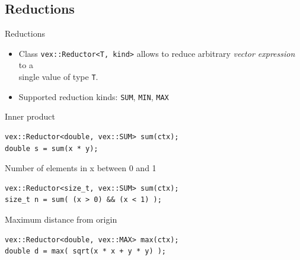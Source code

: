 \documentclass[@BEAMER_OPTIONS@]{beamer}
\newcommand{\code}[1]{\lstinline|#1|}
\begin{document}

\subsection{Reductions}

\begin{frame}[fragile]{Reductions}
    \begin{itemize}
        \item Class \code{vex::Reductor<T, kind>} allows to reduce arbitrary
            \emph{vector expression} to a\\ single value of type \code{T}.
        \item Supported reduction kinds: \code{SUM}, \code{MIN}, \code{MAX}
    \end{itemize}
    \begin{exampleblock}{Inner product}
        \begin{lstlisting}
vex::Reductor<double, vex::SUM> sum(ctx);
double s = sum(x * y);
        \end{lstlisting}
    \end{exampleblock}
    \begin{exampleblock}{Number of elements in x between 0 and 1}
        \begin{lstlisting}
vex::Reductor<size_t, vex::SUM> sum(ctx);
size_t n = sum( (x > 0) && (x < 1) );
        \end{lstlisting}
    \end{exampleblock}
    \begin{exampleblock}{Maximum distance from origin}
        \begin{lstlisting}
vex::Reductor<double, vex::MAX> max(ctx);
double d = max( sqrt(x * x + y * y) );
        \end{lstlisting}
    \end{exampleblock}
\end{frame}
\end{document}
